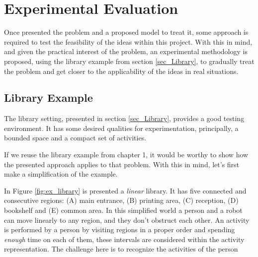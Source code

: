 \chapter{Experimental Evaluation} %

Once presented the problem and a proposed model to treat it, some approach is required to test the feasibility of the ideas within this project.
With this in mind, and given the practical interest of the problem, an experimental methodology is proposed, using the library example from section \ref{sec_Library}, to gradually treat the problem and get closer to the applicability of the ideas in real situations.




\section{Library Example}

The library setting, presented in section \ref{sec_Library}, provides a good testing environment.
It has some desired qualities for experimentation, principally, a bounded space and a compact set of activities.












If we reuse the library example from chapter 1, it would be worthy to show how the presented approach applies to that problem.
With this in mind, let's first make a simplification of the example.

In Figure \ref{fig:ex_library} is presented a \textit{linear} library. 
It has five connected and consecutive regions: (A) main entrance, (B) printing area, (C) reception, (D) bookshelf and (E) common area.
In this simplified world a person and a robot can move linearly to any region, and they don't obstruct each other.
An activity is performed by a person by visiting regions in a proper order and spending \textit{enough} time on each of them, these intervals are considered within the activity representation.
The challenge here is to recognize the activities of the person


